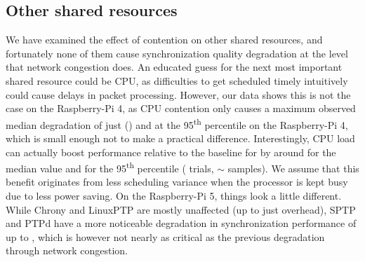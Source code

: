 
\subsection{Other shared resources}


We have examined the effect of contention on other shared resources, and fortunately none of them cause synchronization quality degradation at the level that network congestion does.
An educated guess for the next most important shared resource could be CPU, as difficulties to get scheduled timely intuitively could cause delays in packet processing.
However, our data shows this is not the case on the Raspberry-Pi 4, as CPU contention only causes a maximum observed median degradation of just \fRelative{\cmpMax} (\fVendor{\cmpMaxArg}) and \fRelative{\cmpMax} at the 95\textsuperscript{th} percentile on the Raspberry-Pi 4, which is small enough not to make a practical difference.
Interestingly, CPU load can actually boost performance relative to the baseline for \fVendor{\cmpMinArg} by around \fRelativeInverted{\cmpMin} for the median value and \fRelativeInverted{\cmpMin} for the 95\textsuperscript{th} percentile ( trials, $\sim$ samples).%
%
%
We assume that this benefit originates from less scheduling variance when the processor is kept busy due to less power saving.
%
%
On the Raspberry-Pi 5, things look a little different. While Chrony and LinuxPTP are mostly unaffected (up to just \fRelative{\cmpMax} overhead),
%
%
SPTP and PTPd have a more noticeable degradation in synchronization performance of up to \fRatio[1]{\cmpMax}, which is however not nearly as critical as the previous degradation through network congestion.

